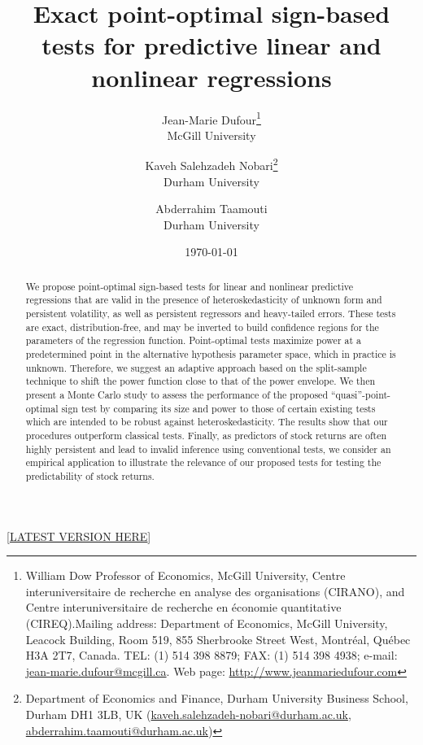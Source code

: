 \documentclass[harvard,11pt]{article}
\newcommand*\samethanks[1][\value{footnote}]{\footnotemark[#1]}
\begin{document}
\title{{Exact point-optimal sign-based tests for predictive linear and nonlinear regressions}}
\author{Jean-Marie Dufour\thanks{%
William Dow Professor of Economics, McGill University, Centre interuniversitaire de recherche en analyse des
organisations (CIRANO), and Centre interuniversitaire de recherche en économie quantitative (CIREQ).Mailing address:
Department of Economics, McGill University, Leacock Building, Room 519, 855 Sherbrooke Street West, Montréal,
Québec H3A 2T7, Canada. TEL: (1) 514 398 8879; FAX: (1) 514 398 4938; e-mail: \href{emailto:jean-marie.dufour@mcgill.ca}{jean-marie.dufour@mcgill.ca}. Web
page: \href{http://www.jeanmariedufour.com}{http://www.jeanmariedufour.com}}\\
McGill University\and Kaveh Salehzadeh Nobari\thanks{%
Department of Economics and Finance, Durham University Business School, Durham DH1 3LB, UK
(\href{emailto: kaveh.salehzadeh-nobari@durham.ac.uk)}{kaveh.salehzadeh-nobari@durham.ac.uk}, \href{emailto: abderrahim.taamouti@durham.ac.uk)}{abderrahim.taamouti@durham.ac.uk})}\\
Durham University \and Abderrahim Taamouti\samethanks[2]\\
Durham University}
\date{\today}
\maketitle
\begin{center}
[\href{https://kavehsn.github.io/Job-Market-Paper/Point_Optimal_Sign_Tests_Dependent_Data_2020.pdf}{\underline{LATEST VERSION HERE}}]
\end{center}


\begin{abstract}
We propose point-optimal sign-based tests for linear and nonlinear predictive regressions that are valid
 in the presence of heteroskedasticity of unknown form and persistent volatility, as well as persistent regressors and heavy-tailed errors. These tests are exact, distribution-free, and may be inverted to build confidence regions for the parameters of the
regression function. Point-optimal tests maximize power at a predetermined point in the alternative hypothesis parameter space, which in practice is unknown. Therefore, we suggest an adaptive approach based on the split-sample technique to shift the power function close to that of the power envelope. We then present a Monte Carlo study to assess the performance of the proposed \textquotedblleft quasi\textquotedblright -point-optimal sign test by comparing its size and
power to those of certain existing tests which are intended to be robust
against heteroskedasticity. The results show that our procedures outperform classical tests. Finally, as predictors of stock returns are often highly persistent and lead to invalid inference using conventional tests, we consider an empirical application to
illustrate the relevance of our proposed tests for testing the
predictability of stock returns.
\end{abstract}
\end{document}
